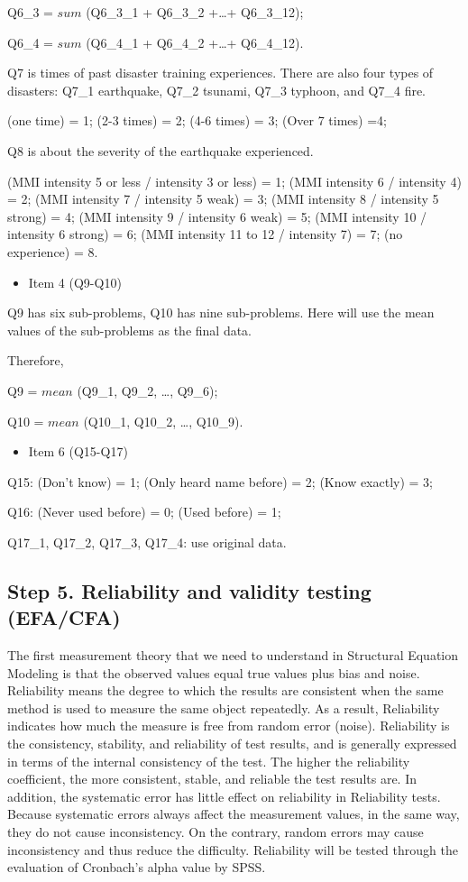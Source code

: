 Q6\_3 = $sum$ (Q6\_3\_1 + Q6\_3\_2 +\dots+ Q6\_3\_12);

Q6\_4 = $sum$ (Q6\_4\_1 + Q6\_4\_2 +\dots+ Q6\_4\_12).

Q7 is times of past disaster training experiences. There are also four types of disasters: Q7\_1 earthquake, Q7\_2 tsunami, Q7\_3 typhoon, and Q7\_4 fire.
 
(one time) = 1; (2-3 times) = 2; (4-6 times) = 3; (Over 7 times) =4;

Q8 is about the severity of the earthquake experienced.

(MMI intensity 5 or less / intensity 3 or less) = 1; (MMI intensity 6 / intensity 4) = 2; (MMI intensity 7 / intensity 5 weak) = 3; (MMI intensity 8 / intensity 5 strong) = 4; (MMI intensity 9 / intensity 6 weak) = 5; (MMI intensity 10 / intensity 6 strong) = 6; (MMI intensity 11 to 12 / intensity 7) = 7; (no experience) = 8.


\begin{itemize}
\item Item 4 (Q9-Q10)
\end{itemize}

Q9 has six sub-problems, Q10 has nine sub-problems. Here will use the mean values of the sub-problems as the final data. 

Therefore, 

Q9 = $mean$ (Q9\_1, Q9\_2, \dots, Q9\_6);

Q10 = $mean$ (Q10\_1, Q10\_2, \dots, Q10\_9).

\begin{itemize}
\item Item 6 (Q15-Q17)
\end{itemize}

Q15: (Don't know) = 1; (Only heard name before) = 2; (Know exactly) = 3;

Q16: (Never used before) = 0; (Used before) = 1;
 
Q17\_1, Q17\_2, Q17\_3, Q17\_4: use original data.

\subsection{Step 5. Reliability and validity testing (EFA/CFA)}

The first measurement theory that we need to understand in Structural Equation Modeling is that the observed values equal true values plus bias and noise. Reliability means the degree to which the results are consistent when the same method is used to measure the same object repeatedly. As a result, Reliability indicates how much the measure is free from random error (noise). Reliability is the consistency, stability, and reliability of test results, and is generally expressed in terms of the internal consistency of the test. The higher the reliability coefficient, the more consistent, stable, and reliable the test results are. In addition, the systematic error has little effect on reliability in Reliability tests. Because systematic errors always affect the measurement values, in the same way, they do not cause inconsistency. On the contrary, random errors may cause inconsistency and thus reduce the difficulty. Reliability will be tested through the evaluation of Cronbach's alpha value by SPSS. 

